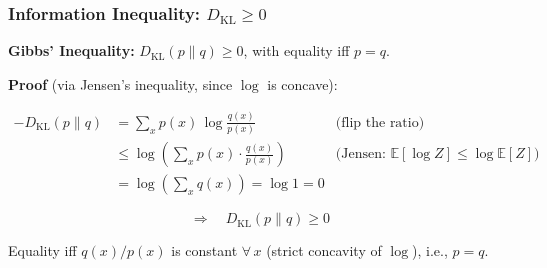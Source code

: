 \documentclass[aspectratio=169]{beamer}
\begin{document}
\begin{frame}
\frametitle{Information Inequality: $D_{\text{KL}} \geq 0$}

\small
\textbf{Gibbs' Inequality:} $D_{\text{KL}}(p \| q) \geq 0$, with equality iff $p = q$.

\vspace{0.05cm}
\textbf{Proof} (via Jensen's inequality, since $\log$ is concave):

\vspace{-0.25cm}
\begin{align*}
  -D_{\text{KL}}(p \| q) &= \sum_x p(x)\,\log\frac{q(x)}{p(x)} &\text{(flip the ratio)}\\[2pt]
  &\leq \log\!\left(\sum_x p(x)\cdot\frac{q(x)}{p(x)}\right) &\text{(Jensen: $\mathbb{E}[\log Z] \leq \log\mathbb{E}[Z]$)}\\[2pt]
  &= \log\!\left(\sum_x q(x)\right) = \log 1 = 0
\end{align*}

\vspace{-0.4cm}
$$\Rightarrow\quad D_{\text{KL}}(p \| q) \geq 0$$

\pause
\vspace{-0.1cm}
Equality iff $q(x)/p(x)$ is constant $\forall\, x$ (strict concavity of $\log$), i.e., $p = q$.

\vspace{0.05cm}
\begin{center}
\end{center}
\end{frame}
\end{document}
